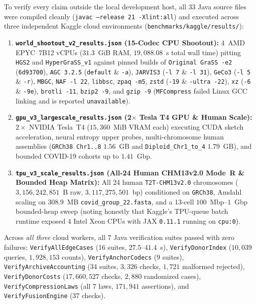 \documentclass[10pt]{article}
\theoremstyle{definition}
\begin{document}
To verify every claim outside the local development host, all 33 Java source files were compiled cleanly (\texttt{javac --release 21 -Xlint:all}) and executed across three independent Kaggle cloud environments (\texttt{benchmarks/kaggle/results/}):
\begin{enumerate}
  \item \textbf{\texttt{world\_shootout\_v2\_results.json} (15-Codec CPU Shootout):} 4~AMD EPYC~7B12 vCPUs ($31.3$~GiB RAM, $19,088.08$~s total wall time) pitting \texttt{HGS2} and \texttt{HyperGraSS\_v1} against pinned builds of \texttt{Original GraSS -e2} (\texttt{6d93700}), \texttt{AGC~3.2.5} (\texttt{default} \& \texttt{-a}), \texttt{JARVIS3} (\texttt{-l 7} \& \texttt{-l 31}), \texttt{GeCo3} (\texttt{-l 5} \& \texttt{-r}), \texttt{MBGC}, \texttt{NAF -l 22}, \texttt{libbsc}, \texttt{zpaq -m5}, \texttt{zstd} (\texttt{-19} \& \texttt{-ultra -22}), \texttt{xz} (\texttt{-6} \& \texttt{-9e}), \texttt{brotli -11}, \texttt{bzip2 -9}, and \texttt{gzip -9} (\texttt{MFCompress} failed Linux GCC linking and is reported \texttt{unavailable}).
  \item \textbf{\texttt{gpu\_v3\_largescale\_results.json} (2$\times$ Tesla T4 GPU \& Human Scale):} $2\times$ NVIDIA Tesla~T4 ($15,360$~MiB VRAM each) executing CUDA sketch acceleration, neural entropy upper probes, multi-chromosome human assemblies (\texttt{GRCh38 Chr1..8} $1.56$~GB and \texttt{Diploid\_Chr1\_to\_4} $1.79$~GB), and bounded COVID-19 cohorts up to $1.41$~Gbp.
  \item \textbf{\texttt{tpu\_v3\_scale\_results.json} (All-24 Human CHM13v2.0 Mode~R \& Bounded Heap Matrix):} All 24 human \texttt{T2T-CHM13v2.0} chromosomes ($3,156,242,851$~B raw, $3,117,275,501$~bp) conditioned on \texttt{GRCh38}, Amdahl scaling on $308.9$~MB \texttt{covid\_group\_22.fasta}, and a 13-cell $100$~Mbp--$1$~Gbp bounded-heap sweep (noting honestly that Kaggle's TPU-queue batch runtime exposed 4 Intel Xeon CPUs with JAX \texttt{0.11.1} running on \texttt{cpu:0}).
\end{enumerate}

Across \emph{all three} cloud workers, all 7 Java verification suites passed with zero failures: \texttt{VerifyAllEdgeCases} (16 suites, $27.5\text{--}41.4$~s), \texttt{VerifyDonorIndex} ($10,039$ queries, $1,928,153$ counts), \texttt{VerifyAnchorCodecs} (9 suites), \texttt{VerifyArchiveAccounting} (34 suites, $3,326$ checks, $1,721$ malformed rejected), \texttt{VerifyDonorCosts} ($17,660,527$ checks, $2,880$ randomized cases), \texttt{VerifyCompressionLaws} (all 7 laws, $171,941$ assertions), and \texttt{VerifyFusionEngine} (37 checks).
\end{document}

